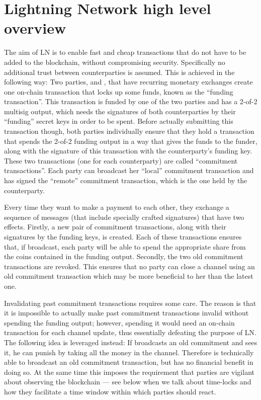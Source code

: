 \section{Lightning Network high level overview}
    The aim of LN is to enable fast and cheap transactions that do not have to
    be added to the blockchain, without compromising security. Specifically no
    additional trust between counterparties is assumed. This is achieved in the
    following way: Two parties, \alice{} and \bob, that have recurring monetary
    exchanges create one on-chain transaction that locks up some funds, known as
    the ``funding transaction''. This transaction is funded by one of the two
    parties and has a 2-of-2 multisig output, which needs the signatures of both
    counterparties by their ``funding'' secret keys in order to be spent. Before
    actually submitting this transaction though, both parties individually
    ensure that they hold a transaction that spends the 2-of-2 funding output in
    a way that gives the funds to the funder, along with the signature of this
    transaction with the counterparty's funding key. These two transactions (one
    for each counterparty) are called ``commitment transactions''. Each party
    can broadcast her ``local'' commitment transaction and has signed the
    ``remote'' commitment transaction, which is the one held by the
    counterparty.

    Every time they want to make a payment to each other, they exchange a
    sequence of messages (that include specially crafted signatures) that have
    two effects.  Firstly, a new pair of commitment transactions, along with
    their signatures by the funding keys, is created. Each of these transactions
    ensures that, if broadcast, each party will be able to spend the appropriate
    share from the coins contained in the funding output.  Secondly, the two old
    commitment transactions are revoked.  This ensures that no party can close a
    channel using an old commitment transaction which may be more beneficial to
    her than the latest one.

    Invalidating past commitment transactions requires some care. The reason is
    that it is impossible to actually make past commitment transactions invalid
    without spending the funding output; however, spending it would need an
    on-chain transaction for each channel update, thus essentially defeating the
    purpose of LN. The following idea is leveraged instead: If \alice{}
    broadcasts an old commitment and \bob{} sees it, he can punish \alice{} by
    taking all the money in the channel. Therefore \alice{} is technically able
    to broadcast an old commitment transaction, but has no financial benefit in
    doing so. At the same time this imposes the requirement that parties are
    vigilant about observing the blockchain --- see below when we talk about
    time-locks and how they facilitate a  time window within which  parties
    should react.

